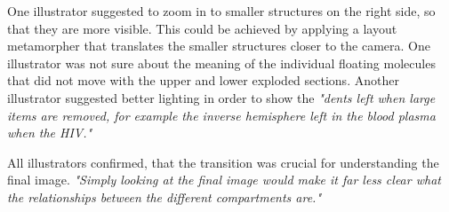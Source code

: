 One illustrator suggested to zoom in to smaller structures on the right side, so that they are more visible. This could be achieved by applying a layout metamorpher that translates the smaller structures closer to the camera. One illustrator was not sure about the meaning of the individual floating molecules that did not move with the upper and lower exploded sections. Another illustrator suggested better lighting in order to show the \textit{"dents left when large items are removed, for example the inverse hemisphere left in the blood plasma when the HIV."}

All illustrators confirmed, that the transition was crucial for understanding the final image. \textit{"Simply looking at the final image would make it far less clear what the relationships between the different compartments are."}










